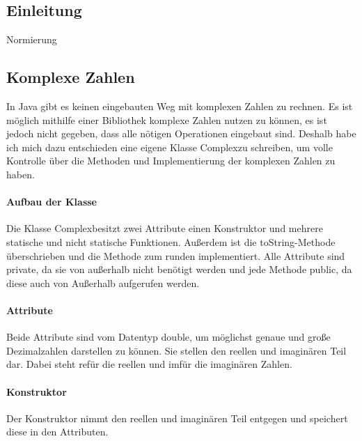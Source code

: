 \documentclass[12pt]{article}
\begin{document}
\subsection{Einleitung}
Normierung
\subsection{Komplexe Zahlen}
In Java gibt es keinen eingebauten Weg mit komplexen Zahlen zu rechnen. Es ist möglich mithilfe einer Bibliothek komplexe Zahlen nutzen zu können, es ist jedoch nicht gegeben, dass alle nötigen Operationen eingebaut sind. Deshalb habe ich mich dazu entschieden eine eigene Klasse \glqq Complex\grqq zu schreiben, um volle Kontrolle über die Methoden und Implementierung der komplexen Zahlen zu haben.

\paragraph{Aufbau der Klasse}
Die Klasse \glqq Complex\glqq\space besitzt zwei Attribute einen Konstruktor und mehrere statische und nicht statische Funktionen. Außerdem ist die \glqq toString\glqq-Methode überschrieben und die Methode zum runden implementiert. Alle Attribute sind \glqq private\grqq, da sie von außerhalb nicht benötigt werden und jede Methode \glqq public\glqq, da diese auch von Außerhalb aufgerufen werden.

\paragraph{Attribute}
Beide Attribute sind vom Datentyp \glqq double\grqq, um möglichst genaue und große Dezimalzahlen darstellen zu können. Sie stellen den reellen und imaginären Teil dar. Dabei steht \glqq re\grqq\space für die reellen und \glqq im\grqq\space für die imaginären Zahlen.

\paragraph{Konstruktor}
Der Konstruktor nimmt den reellen und imaginären Teil entgegen und speichert diese in den Attributen.
\end{document}
